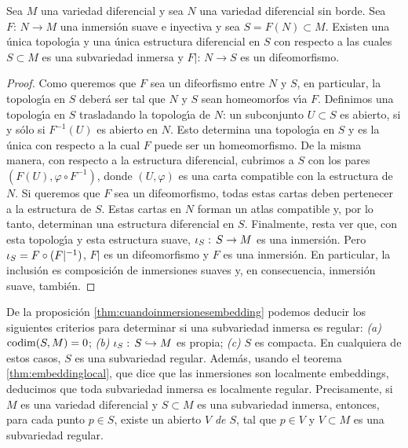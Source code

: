 \begin{propoInmersaEsInmersa}\label{thm:inmersaesinmersa}
	Sea $M$ una variedad diferencial y sea $N$ una variedad diferencial
	sin borde. Sea $F:\,N\rightarrow M$ una inmersi\'{o}n suave e
	inyectiva y sea $S=F(N)\subset M$. Existen una \'{u}nica
	topolog\'{\i}a y una \'{u}nica estructura diferencial en $S$ con
	respecto a las cuales $S\subset M$ es una subvariedad inmersa y
	$F|:\,N\rightarrow S$ es un difeomorfismo.
\end{propoInmersaEsInmersa}

\begin{proof}
	Como queremos que $F$ sea un difeorfismo entre $N$ y $S$, en
	particular, la topolog\'{\i}a en $S$ deber\'{a} ser tal que
	$N$ y $S$ sean homeomorfos v\'{\i}a $F$. Definimos una topolog\'{\i}a
	en $S$ trasladando la topolog\'{\i}a de $N$: un subconjunto
	$U\subset S$ es abierto, si y s\'{o}lo si $F^{-1}(U)$ es abierto
	en $N$. Esto determina una topolog\'{\i}a en $S$ y es la \'{u}nica
	con respecto a la cual $F$ puede ser un homeomorfismo. De la misma
	manera, con respecto a la estructura diferencial, cubrimos a $S$
	con los pares $(F(U),\varphi\circ F^{-1})$, donde $(U,\varphi)$
	es una carta compatible con la estructura de $N$. Si queremos que $F$
	sea un difeomorfismo, todas estas cartas deben pertenecer a la
	estructura de $S$. Estas cartas en $N$ forman un atlas compatible y,
	por lo tanto, determinan una estructura diferencial en $S$. Finalmente,
	resta ver que, con esta topolog\'{\i}a y esta estructura suave,
	$\inc[S]:\,S\rightarrow M$ es una inmersi\'{o}n. Pero
	$\inc[S]=F\circ (F|^{-1})$, $F|$ es un difeomorfismo y $F$ es una
	inmersi\'{o}n. En particular, la inclusi\'{o}n es composici\'{o}n
	de inmersiones suaves y, en consecuencia, inmersi\'{o}n suave,
	tambi\'{e}n.
\end{proof}

\begin{obsCuandoInmersaEsRegular}\label{obs:cuandoinmersionesembedding}
	De la proposici\'{o}n \ref{thm:cuandoinmersionesembedding} podemos
	deducir los siguientes criterios para determinar si una subvariedad
	inmersa es regular: \emph{(a)} $\codim(S,M)=0$; \emph{(b)}
	$\inc[S]:\,S\hookrightarrow M$ es propia; \emph{(c)} $S$ es compacta.
	En cualquiera de estos casos, $S$ es una subvariedad regular.
	Adem\'{a}s, usando el teorema \ref{thm:embeddinglocal},
	que dice que las inmersiones son localmente embeddings, deducimos que
	toda subvariedad inmersa es localmente regular. Precisamente,
	si $M$ es una variedad diferencial y $S\subset M$ es una subvariedad
	inmersa, entonces, para cada punto $p\in S$, existe un abierto
	$V$ \emph{de $S$}, tal que $p\in V$ y $V\subset M$ es una subvariedad
	regular.
\end{obsCuandoInmersaEsRegular}

